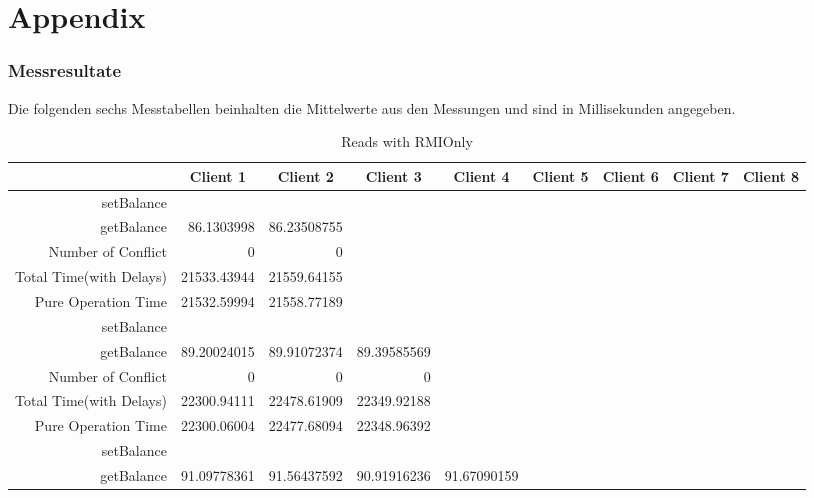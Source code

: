 \chapter{Appendix}
\subsection{Messresultate}
\label{sec:messresultate}
Die folgenden sechs Messtabellen beinhalten die Mittelwerte aus den Messungen und sind in Millisekunden angegeben.

\begin{landscape}
\begin{table}[htbp]
  \scriptsize
  \centering
  \caption{Reads with RMIOnly}
    \begin{tabular}{rrrrrrrrr}
    \toprule
          & \multicolumn{1}{c}{Client 1} & \multicolumn{1}{c}{Client 2} & \multicolumn{1}{c}{Client 3} & \multicolumn{1}{c}{Client  4} & \multicolumn{1}{c}{Client 5} & \multicolumn{1}{c}{Client 6} & \multicolumn{1}{c}{Client 7} & \multicolumn{1}{c}{Client 8} \\
    \midrule
    setBalance &       &       &       &       &       &       &       &  \\
    getBalance & 86.1303998 & 86.23508755 &       &       &       &       &       &  \\
    Number of Conflict & 0     & 0     &       &       &       &       &       &  \\
    Total Time(with Delays) & 21533.43944 & 21559.64155 &       &       &       &       &       &  \\
    Pure Operation Time & 21532.59994 & 21558.77189 &       &       &       &       &       &  \\
     \cline{1-9}
    setBalance &       &       &       &       &       &       &       &  \\
    getBalance & 89.20024015 & 89.91072374 & 89.39585569 &       &       &       &       &  \\
    Number of Conflict & 0     & 0     & 0     &       &       &       &       &  \\
    Total Time(with Delays) & 22300.94111 & 22478.61909 & 22349.92188 &       &       &       &       &  \\
    Pure Operation Time & 22300.06004 & 22477.68094 & 22348.96392 &       &       &       &       &  \\
    \cline{1-9}
    setBalance &       &       &       &       &       &       &       &  \\
    getBalance & 91.09778361 & 91.56437592 & 90.91916236 & 91.67090159 &       &       &       &  \\

\end{tabular}
\end{table}
\end{landscape}
